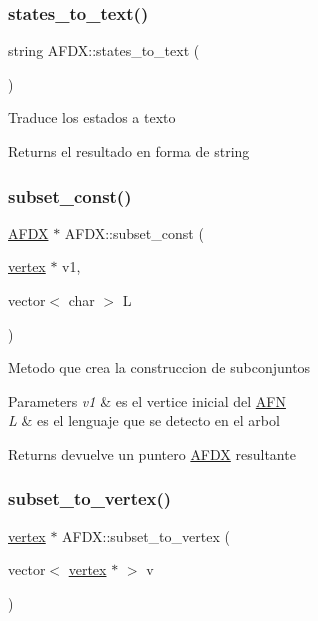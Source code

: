 \subsubsection{\texorpdfstring{states\+\_\+to\+\_\+text()}{states\_to\_text()}}
{\footnotesize\ttfamily string A\+F\+D\+X\+::states\+\_\+to\+\_\+text (\begin{DoxyParamCaption}{ }\end{DoxyParamCaption})}

Traduce los estados a texto \begin{DoxyReturn}{Returns}
el resultado en forma de string 
\end{DoxyReturn}
\hypertarget{class_a_f_d_x_a7f4f46c25fb5a5b3f1be898dde218aa2}{}\label{class_a_f_d_x_a7f4f46c25fb5a5b3f1be898dde218aa2} 
\subsubsection{\texorpdfstring{subset\+\_\+const()}{subset\_const()}}
{\footnotesize\ttfamily \hyperlink{class_a_f_d_x}{A\+F\+DX} $\ast$ A\+F\+D\+X\+::subset\+\_\+const (\begin{DoxyParamCaption}\item[{\hyperlink{structvertex}{vertex} $\ast$}]{v1,  }\item[{vector$<$ char $>$}]{L }\end{DoxyParamCaption})}

Metodo que crea la construccion de subconjuntos 
\begin{DoxyParams}{Parameters}
{\em v1} & es el vertice inicial del \hyperlink{class_a_f_n}{A\+FN} \\
\hline
{\em L} & es el lenguaje que se detecto en el arbol \\
\hline
\end{DoxyParams}
\begin{DoxyReturn}{Returns}
devuelve un puntero \hyperlink{class_a_f_d_x}{A\+F\+DX} resultante 
\end{DoxyReturn}
\hypertarget{class_a_f_d_x_a55926260ee08e47aced2343f9672f28f}{}\label{class_a_f_d_x_a55926260ee08e47aced2343f9672f28f} 
\subsubsection{\texorpdfstring{subset\+\_\+to\+\_\+vertex()}{subset\_to\_vertex()}}
{\footnotesize\ttfamily \hyperlink{structvertex}{vertex} $\ast$ A\+F\+D\+X\+::subset\+\_\+to\+\_\+vertex (\begin{DoxyParamCaption}\item[{vector$<$ \hyperlink{structvertex}{vertex} $\ast$ $>$}]{v }\end{DoxyParamCaption})}

